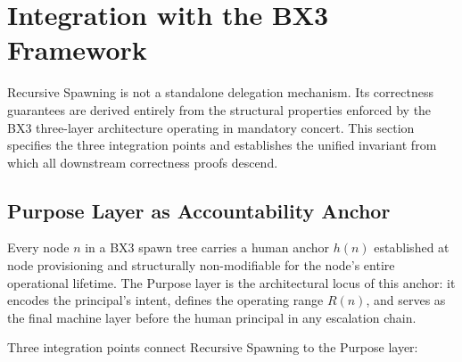 \section{Integration with the BX3 Framework}
\label{sec:rs-integration}

Recursive Spawning is not a standalone delegation mechanism. Its correctness
guarantees are derived entirely from the structural properties enforced by the
BX3 three-layer architecture operating in mandatory concert.  This section
specifies the three integration points and establishes the unified invariant
from which all downstream correctness proofs descend.

\subsection{Purpose Layer as Accountability Anchor}
\label{sec:rs-purpose-anchor}

Every node $n$ in a BX3 spawn tree carries a human anchor $h(n)$ established at
node provisioning and structurally non-modifiable for the node's entire
operational lifetime.  The Purpose layer is the architectural locus of this
anchor: it encodes the principal's intent, defines the operating range $R(n)$,
and serves as the final machine layer before the human principal in any
escalation chain.

Three integration points connect Recursive Spawning to the Purpose layer:

